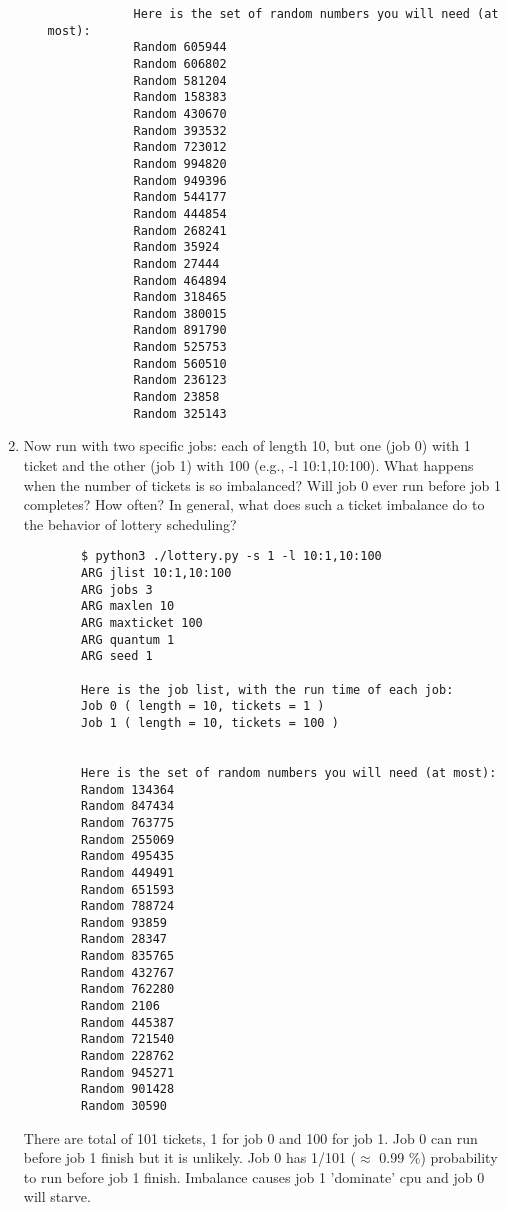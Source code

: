 \documentclass{article}
\begin{document}
\begin{enumerate}[label=\textbf{\arabic*}), start=1]
\begin{enumerate}[label=\textbf{\arabic*}), start=1]
{\begin{verbatim}
            Here is the set of random numbers you will need (at most):
            Random 605944
            Random 606802
            Random 581204
            Random 158383
            Random 430670
            Random 393532
            Random 723012
            Random 994820
            Random 949396
            Random 544177
            Random 444854
            Random 268241
            Random 35924
            Random 27444
            Random 464894
            Random 318465
            Random 380015
            Random 891790
            Random 525753
            Random 560510
            Random 236123
            Random 23858
            Random 325143
    \end{verbatim}
    }

    \end{enumerate}
    \newpage

    \item Now run with two specific jobs: each of length 10,
    but one (job 0) with 1 ticket and the other (job 1) with
    100 (e.g., -l 10:1,10:100). What happens when the number
    of tickets is so imbalanced? Will job 0 ever run before
    job 1 completes? How often? In general, what does such 
    a ticket imbalance do to the behavior of lottery scheduling?

    {\scriptsize
    \begin{verbatim}
        $ python3 ./lottery.py -s 1 -l 10:1,10:100
        ARG jlist 10:1,10:100
        ARG jobs 3
        ARG maxlen 10
        ARG maxticket 100
        ARG quantum 1
        ARG seed 1

        Here is the job list, with the run time of each job: 
        Job 0 ( length = 10, tickets = 1 )
        Job 1 ( length = 10, tickets = 100 )


        Here is the set of random numbers you will need (at most):
        Random 134364
        Random 847434
        Random 763775
        Random 255069
        Random 495435
        Random 449491
        Random 651593
        Random 788724
        Random 93859
        Random 28347
        Random 835765
        Random 432767
        Random 762280
        Random 2106
        Random 445387
        Random 721540
        Random 228762
        Random 945271
        Random 901428
        Random 30590
    \end{verbatim}
    }
    There are total of 101 tickets, 1 for job 0 and 100 for job 1. Job 0
    can run before job 1 finish but it is unlikely. Job 0 has 1/101
    (\(\approx\) 0.99 \%) probability to run before job 1 finish.
    Imbalance causes job 1 'dominate' cpu and job 0 will starve.
\end{enumerate}
\end{document}

